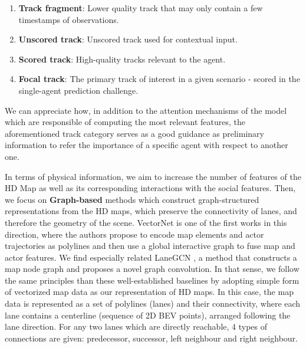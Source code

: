 \begin{enumerate}
	\item \textbf{Track fragment}: Lower quality track that may only contain a few timestamps of observations.
	\item \textbf{Unscored track}: Unscored track used for contextual input.
	\item \textbf{Scored track}: High-quality tracks relevant to the agent.
	\item \textbf{Focal track}: The primary track of interest in a given scenario - scored in the single-agent prediction challenge.
\end{enumerate}

We can appreciate how, in addition to the attention mechanisms of the model which are responsible of computing the most relevant features, the aforementioned track category serves as a good guidance as preliminary information to refer the importance of a specific agent with respect to another one.

In terms of physical information, we aim to increase the number of features of the HD Map as well as its corresponding interactions with the social features. Then, we focus on \textbf{Graph-based} methods \cite{zeng2021lanercnn} which construct graph-structured representations from the HD maps, which preserve the connectivity of lanes, and therefore the geometry of the scene. VectorNet \cite{gao2020vectornet} is one of the first works in this direction, where the authors propose to encode map elements and actor trajectories as polylines and then use a global interactive graph to fuse map and actor features. We find especially related LaneGCN \cite{liang2020learning}, a method that constructs a map node graph and proposes a novel graph convolution. In that sense, we follow the same principles than these well-established baselines by adopting simple form of vectorized map data as our representation of HD maps. In this case, the map data is represented as a set of polylines (lanes) and
their connectivity, where each lane contains a centerline (sequence of 2D \ac{BEV} points), arranged following the lane direction. For any two lanes which are directly reachable, 4 types of connections are given: predecessor, successor, left neighbour and right neighbour.

